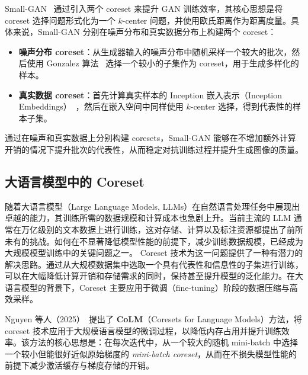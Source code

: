 \documentclass[lang=cn,newtx,10pt,scheme=chinese,chinesefont=nofont,citestyle=gb7714-2015, bibstyle=gb7714-2015]{elegantbook}
\begin{document}
\begin{refsection}
\begin{example}
\label{ex:small-gan}
Small-GAN~\cite{sinha2020small} 通过引入两个 coreset 来提升 GAN 训练效率，其核心思想是将 coreset 选择问题形式化为一个 $k$-center 问题，并使用欧氏距离作为距离度量。具体来说，Small-GAN 分别在噪声分布和真实数据分布上构建两个 coreset：
\begin{itemize}
    \item \textbf{噪声分布 coreset}：从生成器输入的噪声分布中随机采样一个较大的批次，然后使用 Gonzalez 算法~\cite{gonzalez1985clustering} 选择一个较小的子集作为 coreset，用于生成多样化的样本。
    \item \textbf{真实数据 coreset}：首先计算真实样本的 Inception 嵌入表示（Inception Embeddings）~\cite{szegedy2017inception}，然后在嵌入空间中同样使用 $k$-center 选择，得到代表性的样本子集。
\end{itemize}
通过在噪声和真实数据上分别构建 coresets，Small-GAN 能够在不增加额外计算开销的情况下提升批次的代表性，从而稳定对抗训练过程并提升生成图像的质量。
\end{example}

\subsection{大语言模型中的 \textrm{Coreset}}

随着大语言模型（Large Language Models, LLMs）在自然语言处理任务中展现出卓越的能力，其训练所需的数据规模和计算成本也急剧上升。当前主流的 LLM 通常在万亿级别的文本数据上进行训练，这对存储、计算以及标注资源都提出了前所未有的挑战。如何在不显著降低模型性能的前提下，减少训练数据规模，已经成为大规模模型训练中的关键问题之一。 \textrm{Coreset} 技术为这一问题提供了一种有潜力的解决思路。通过从大规模数据集中选取一个具有代表性和信息性的子集进行训练，可以在大幅降低计算开销和存储需求的同时，保持甚至提升模型的泛化能力。在大语言模型的背景下，\textrm{Coreset} 主要应用于微调（fine-tuning）阶段的数据压缩与高效采样。

\begin{example}
\label{ex:colm}
Nguyen 等人（2025）~\cite{nguyen2025mini}提出了 \textbf{CoLM}（Coresets for Language Models）方法，将 coreset 技术应用于大规模语言模型的微调过程，以降低内存占用并提升训练效率。该方法的核心思想是：在每次迭代中，从一个较大的随机 mini-batch 中选择一个较小但能很好近似原始梯度的 \emph{mini-batch coreset}，从而在不损失模型性能的前提下减少激活缓存与梯度存储的开销。


\end{example}
\end{refsection}
\end{document}
